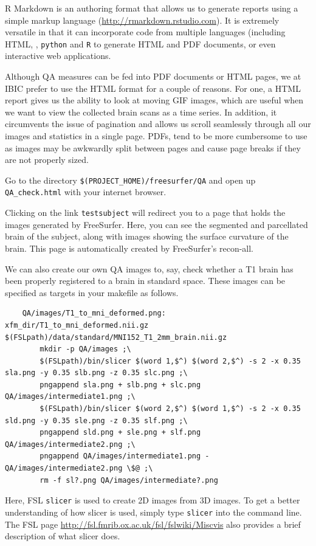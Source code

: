 R Markdown is an authoring format that allows us to generate reports using a simple markup language (\url{http://rmarkdown.rstudio.com}). It is extremely versatile in that it can incorporate code from multiple languages (including HTML, \bashn{}, \texttt{python} and \texttt{R} to generate HTML and PDF documents, or even interactive web applications. 

Although QA measures can be fed into PDF documents or HTML pages, we at IBIC prefer to use the HTML format for a couple of reasons. For one, a HTML report gives us the ability to look at moving GIF images, which are useful when we want to view the collected brain scans as a time series. In addition, it circumvents the issue of pagination and allows us scroll seamlessly through all our images and statistics in a single page. PDFs, tend to be more cumbersome to use as images may be awkwardly split between pages and cause page breaks if they are not properly sized.

Go to the directory \texttt{\$(PROJECT_HOME)/freesurfer/QA} and open up \texttt{QA_check.html} with your internet browser. 

Clicking on the link \texttt{testsubject} will redirect you to a page that holds the images generated by FreeSurfer. Here, you can see the segmented and parcellated brain of the subject, along with images showing the surface curvature of the brain. This page is automatically created by FreeSurfer's recon-all.

We can also create our own QA images to, say, check whether a T1 brain has been properly registered to a brain in standard space. These images can be specified as targets in your makefile as follows.
\begin{lstlisting} 
	QA/images/T1_to_mni_deformed.png: xfm_dir/T1_to_mni_deformed.nii.gz $(FSLpath)/data/standard/MNI152_T1_2mm_brain.nii.gz 
		mkdir -p QA/images ;\
		$(FSLpath)/bin/slicer $(word 1,$^) $(word 2,$^) -s 2 -x 0.35 sla.png -y 0.35 slb.png -z 0.35 slc.png ;\
		pngappend sla.png + slb.png + slc.png QA/images/intermediate1.png ;\
		$(FSLpath)/bin/slicer $(word 2,$^) $(word 1,$^) -s 2 -x 0.35 sld.png -y 0.35 sle.png -z 0.35 slf.png ;\ 
		pngappend sld.png + sle.png + slf.png QA/images/intermediate2.png ;\ 
		pngappend QA/images/intermediate1.png - QA/images/intermediate2.png \$@ ;\ 
		rm -f sl?.png QA/images/intermediate?.png
\end{lstlisting}

Here, FSL \texttt{slicer} is used to create 2D images from 3D images. To get a better understanding of how slicer is used, simply type \texttt{slicer} into the command line. The FSL page \url{http://fsl.fmrib.ox.ac.uk/fsl/fslwiki/Miscvis} also provides a brief description of what slicer does. 

